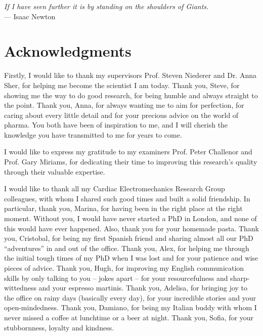 
\begin{flushright}{\slshape
    If I have seen further it is by standing on the shoulders of Giants.} \\ \medskip
    --- Isaac Newton
\end{flushright}

\bigskip

\begingroup
\let\clearpage\relax
\let\cleardoublepage\relax
\let\cleardoublepage\relax
\chapter*{Acknowledgments}
Firstly, I would like to thank my supervisors Prof. Steven Niederer and Dr. Anna Sher, for helping me become the scientist I am today. Thank you, Steve, for showing me the way to do good research, for being humble and always straight to the point. Thank you, Anna, for always wanting me to aim for perfection, for caring about every little detail and for your precious advice on the world of pharma. You both have been of inspiration to me, and I will cherish the knowledge you have transmitted to me for years to come.

\vspace{0.2cm}
I would like to express my gratitude to my examiners Prof. Peter Challenor and Prof. Gary Miriams, for dedicating their time to improving this research's quality through their valuable expertise.

\vspace{0.2cm}
I would like to thank all my Cardiac Electromechanics Research Group colleagues, with whom I shared such good times and built a solid friendship. In particular, thank you, Marina, for having been in the right place at the right moment. Without you, I would have never started a PhD in London, and none of this would have ever happened. Also, thank you for your homemade pasta. Thank you, Cristobal, for being my first Spanish friend and sharing almost all our PhD ``adventures'' in and out of the office. Thank you, Alex, for helping me through the initial tough times of my PhD when I was lost and for your patience and wise pieces of advice. Thank you, Hugh, for improving my English communication skills by only talking to you -- jokes apart -- for your resourcefulness and sharp-wittedness and your espresso martinis. Thank you, Adelisa, for bringing joy to the office on rainy days (basically every day), for your incredible stories and your open-mindedness. Thank you, Damiano, for being my Italian buddy with whom I never missed a coffee at lunchtime or a beer at night. Thank you, Sofia, for your stubbornness, loyalty and kindness.

